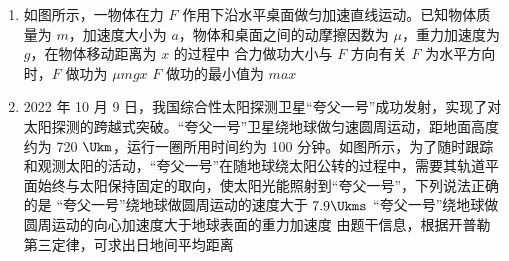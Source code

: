 \documentclass[\gkver]{gaokaozhenti}
\begin{document}
\begin{enumerate}
{C．若误将 $n -$ 1 圈记作 $n$ 圈，则得到的质量偏小，故 C 错误；

D．若测 $R$ 时未计入小球的半径，则 $R$ 偏小，所测质量偏大，故 D 错误。

故选 A。
}

\item
如图所示，一物体在力 $F$ 作用下沿水平桌面做匀加速直线运动。已知物体质量为 $m$，加速度大小为 $a$，物体和桌面之间的动摩擦因数为 $\mu$，重力加速度为 $g$，在物体移动距离为 $x$ 的过程中
\onepicture[w=5.9cm]{}
{合力做功大小与 $F$ 方向有关}
{$F$ 为水平方向时，$F$ 做功为 $\mu mgx$}
{$F$ 做功的最小值为 $max$}

\item
2022 年 10 月 9 日，我国综合性太阳探测卫星“夸父一号”成功发射，实现了对太阳探测的跨越式突破。“夸父一号”卫星绕地球做匀速圆周运动，距地面高度约为 720 $\Ukm$，运行一圈所用时间约为 100 分钟。如图所示，为了随时跟踪和观测太阳的活动，“夸父一号”在随地球绕太阳公转的过程中，需要其轨道平面始终与太阳保持固定的取向，使太阳光能照射到“夸父一号”，下列说法正确的是
{“夸父一号”绕地球做圆周运动的速度大于 $7.9 \Ukms$}
{“夸父一号”绕地球做圆周运动的向心加速度大于地球表面的重力加速度}
{由题干信息，根据开普勒第三定律，可求出日地间平均距离}
\end{enumerate}
\end{document}
